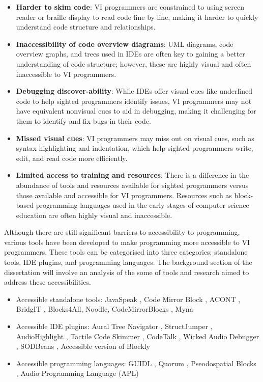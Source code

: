 \documentclass{l4proj}
\begin{document}
\begin{itemize}
    \item \textbf{Harder to skim code}: VI programmers are constrained to using screen reader or braille display to read code line by line, making it harder to quickly understand code structure and relationships.
    \item \textbf{Inaccessibility of code overview diagrams}: UML diagrams, code overview graphs, and trees used in IDEs are often key to gaining a better understanding of code structure; however, these are highly visual and often inaccessible to VI programmers.
    \item \textbf{Debugging discover-ability}: While IDEs offer visual cues like underlined code to help sighted programmers identify issues, VI programmers may not have equivalent nonvisual cues to aid in debugging, making it challenging for them to identify and fix bugs in their code.
    \item \textbf{Missed visual cues}: VI programmers may miss out on visual cues, such as syntax highlighting and indentation, which help sighted programmers write, edit, and read code more efficiently.
    \item \textbf{Limited access to training and resources}: There is a difference in the abundance of tools and resources available for sighted programmers versus those available and accessible for VI programmers. Resources such as block-based programming languages used in the early stages of computer science education are often highly visual and inaccessible.
\end{itemize}


Although there are still significant barriers to accessibility to programming, various tools have been developed to make programming more accessible to VI programmers. These tools can be categorised into three categories: standalone tools, IDE plugins, and programming languages.  The background section of the dissertation will involve an analysis of the some of tools and research aimed to address these accessibilities. 

\begin{itemize}
    \item Accessible standalone tools: JavaSpeak \cite{Javaspeak_2000}, Code Mirror Block \cite{code_mirror_block_2019}, ACONT \cite{ACONT_2018}, BridgIT \cite{BridgIT_2011}, Blocks4All\cite{blocks4all_17, blocks4all_18}, Noodle\cite{Noodle_2014}, CodeMirrorBlocks \cite{code_mirror_block_2019}, Myna \cite{Myna}
    \item Accessible IDE plugins: Aural Tree Navigator \cite{aural_tree_navigator_2003}, StructJumper \cite{structujumper_2015}, AudioHighlight \cite{audiohighlight_2018}, Tactile Code Skimmer \cite{tactile_code_skimmer_2019}, CodeTalk \cite{codetalk_18}, Wicked Audio Debugger \cite{Wicked_audio_debugger_2007}, SODBeans \cite{Sodbeans_2009}, Accessible version of Blockly \cite{Blockly1_2017}
    \item Accessible programming languages: GUIDL \cite{GUIDL_2012}, Quorum \cite{Quorum_2017}, Pseodospatial Blocks \cite{Pseudospatial_blocks_2016}, Audio Programming Language (APL) \cite{Audio_programming_language_2006}
\end{itemize}
\end{document}
